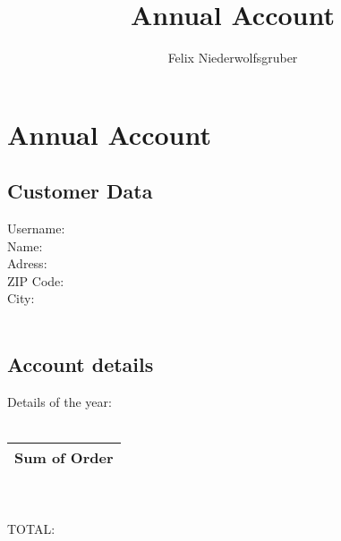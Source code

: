 \documentclass[10pt] {article}
\author{Felix Niederwolfsgruber}
\title{Annual Account}
\begin{document}
\section {Annual Account}
\subsection {Customer Data}
Username: %
\\
Name: %
\\
Adress: %
\\
ZIP Code: %
\\
City: %
\\
\\
\subsection {Account details}
Details of the year: %
\\
\\
\begin{tabular} {|c|}
\hline Sum of Order\\ \hline
\end {tabular}
\\
\\
TOTAL: %
\end{document}
